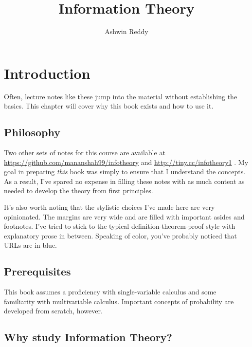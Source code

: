 \documentclass[13pt,oneside]{tufte-book}
\title{Information Theory}
\author{Ashwin Reddy}
\date{}
\theoremstyle{definition}
\theoremstyle{definition}
\theoremstyle{definition}
\theoremstyle{remark}
\begin{document}
{
}

\maketitle



{
\setcounter{tocdepth}{1}
\tableofcontents
}

\listoftables
\listoffigures

\chapter{Introduction}\label{introduction}

Often, lecture notes like these jump into the material without
establishing the basics. This chapter will cover why this book exists
and how to use it.

\section{Philosophy}\label{philosophy}

Two other sets of notes for this course are available at
\url{https://github.com/mananshah99/infotheory} and
\url{http://tiny.cc/infotheory1} . My goal in preparing \emph{this} book
was simply to ensure that I understand the concepts. As a result, I've
spared no expense in filling these notes with as much content as needed
to develop the theory from first principles.

It's also worth noting that the stylistic choices I've made here are
very opinionated. The margins are very wide and are filled with
important asides and footnotes. I've tried to stick to the typical
definition-theorem-proof style with explanatory prose in between.
Speaking of color, you've probably noticed that URLs are in blue.

\section{Prerequisites}\label{prerequisites}

This book assumes a proficiency with single-variable calculus and some
familiarity with multivariable calculus. Important concepts of
probability are developed from scratch, however.

\section{Why study Information
Theory?}\label{why-study-information-theory}
\end{document}
